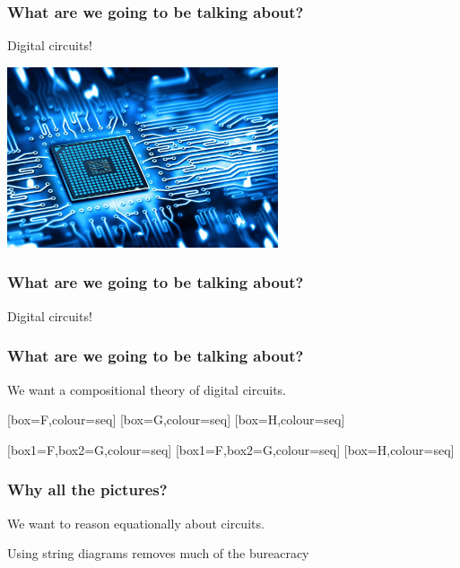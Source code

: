 \begin{frame}
    \frametitle{What are we going to be talking about?}
    \pause
    \centering
    \LARGE
    Digital circuits!

    \includegraphics[width=0.6\textwidth]{imgs/circuit}
\end{frame}
\begin{frame}
    \frametitle{What are we going to be talking about?}
    \centering
    \LARGE
    Digital circuits!

    \vspace{1em}
    \normalsize

\end{frame}
\begin{frame}
    \frametitle{What are we going to be talking about?}

    \pause

    \centering
    \LARGE
    We want a \alert{compositional} theory of digital circuits.

    \vspace{0.5em}

    \normalsize

    \pause
    [box=F,colour=seq]
    \pause
    \quad
    [box=G,colour=seq]
    \pause
    \quad
    [box=H,colour=seq]

    \pause
    \vspace{1em}

    [box1=F,box2=G,colour=seq]
    \quad
    [box1=F,box2=G,colour=seq]
    \quad
    [box=H,colour=seq]

\end{frame}

\begin{frame}
    \frametitle{Why all the pictures?}
    \centering

    \LARGE
    We want to reason \alert{equationally} about circuits.

    \pause

    Using \alert{string diagrams} removes much of the bureacracy

\end{frame}

